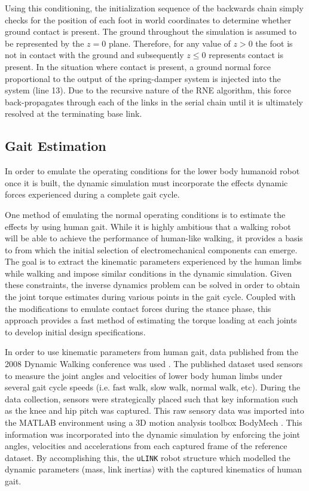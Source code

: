 Using this conditioning, the initialization sequence of the backwards chain simply checks for the position of each foot in world coordinates to determine whether ground contact is present. The ground throughout the simulation is assumed to be represented by the $z = 0$ plane. Therefore, for any value of $z > 0$ the foot is not in contact with the ground and subsequently $z \leq 0$ represents contact is present. In the situation where contact is present, a ground normal force proportional to the output of the spring-damper system is injected into the system (line 13). Due to the recursive nature of the RNE algorithm, this force back-propagates through each of the links in the serial chain until it is ultimately resolved at the terminating base link.


\subsection{Gait Estimation} %
\label{sec:gait_estimation}
	
In order to emulate the operating conditions for the lower body humanoid robot once it is built, the dynamic simulation must incorporate the effects dynamic forces experienced during a complete gait cycle. 
	
One method of emulating the normal operating conditions is to estimate the effects by using human gait. While it is highly ambitious that a walking robot will be able to achieve the performance of human-like walking, it provides a basis to from which the initial selection of electromechanical components can emerge. The goal is to extract the kinematic parameters experienced by the human limbs while walking and impose similar conditions in the dynamic simulation. Given these constraints, the inverse dynamics problem can be solved in order to obtain the joint torque estimates during various points in the gait cycle. Coupled with the modifications to emulate contact forces during the stance phase, this approach provides a fast method of estimating the torque loading at each joints to develop initial design specifications. 
	
In order to use kinematic parameters from human gait, data published from the 2008 Dynamic Walking conference was used \cite{dw2008}. The published dataset used sensors to measure the joint angles and velocities of lower body human limbs under several gait cycle speeds (i.e. fast walk, slow walk, normal walk, etc). During the data collection, sensors were strategically placed such that key information such as the knee and hip pitch was captured. This raw sensory data was imported into the MATLAB environment using a 3D motion analysis toolbox BodyMech \cite{bodymech}. This information was incorporated into the dynamic simulation by enforcing the joint angles, velocities and accelerations from each captured frame of the reference dataset. By accomplishing this, the \texttt{uLINK} robot structure which modelled the dynamic parameters (mass, link inertias) with the captured kinematics of human gait. 

